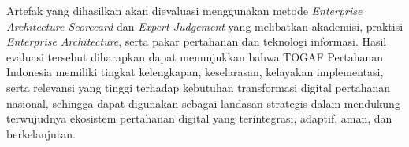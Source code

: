 Artefak yang dihasilkan akan dievaluasi menggunakan metode \textit{Enterprise Architecture Scorecard}\texttrademark{} dan \textit{Expert Judgement} yang melibatkan akademisi, praktisi \textit{Enterprise Architecture}, serta pakar pertahanan dan teknologi informasi.
Hasil evaluasi tersebut diharapkan dapat menunjukkan bahwa TOGAF Pertahanan Indonesia memiliki tingkat kelengkapan, keselarasan, kelayakan implementasi, serta relevansi yang tinggi terhadap kebutuhan transformasi digital pertahanan nasional, sehingga dapat digunakan sebagai landasan strategis dalam mendukung terwujudnya ekosistem pertahanan digital yang terintegrasi, adaptif, aman, dan berkelanjutan.
